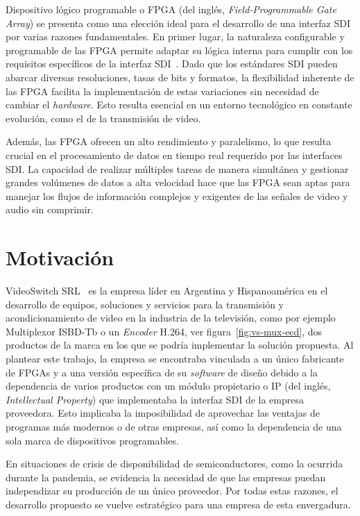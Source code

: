  Dispositivo lógico programable o FPGA (del inglés, \textit{Field-Programmable Gate Array}) se presenta como
  una elección ideal para el desarrollo de una interfaz SDI por varias razones
  fundamentales. En primer lugar, la naturaleza configurable y programable de las
  FPGA permite adaptar su lógica interna para cumplir con los requisitos
  específicos de la interfaz SDI~\citep{design}. Dado que los estándares SDI pueden abarcar
  diversas resoluciones, tasas de bits y formatos, la flexibilidad inherente de
  las FPGA facilita la implementación de estas variaciones sin necesidad de
  cambiar el \textit{hardware}. Esto resulta esencial en un entorno tecnológico
  en constante evolución, como el de la transmisión de video.

  Además, las FPGA ofrecen un alto rendimiento y paralelismo, lo que resulta
  crucial en el procesamiento de datos en tiempo real requerido por las interfaces
  SDI\@. La capacidad de realizar múltiples tareas de manera simultánea y gestionar
  grandes volúmenes de datos a alta velocidad hace que las FPGA sean aptas para
  manejar los flujos de información complejos y exigentes de las señales de video
  y audio sin comprimir.

\section{Motivación}

  VideoSwitch SRL~\citep{vs-srl} es la empresa líder en Argentina y Hispanoamérica
  en el desarrollo de equipos, soluciones y servicios para la transmisión y
  acondicionamiento de video en la industria de la televisión, como por ejemplo
  Multiplexor ISBD-Tb o un \textit{Encoder} H.264, ver figura~\ref{fig:vs-mux-ecd},
  dos productos de la marca en los que se podría implementar la solución propuesta.
  Al plantear este trabajo, la empresa se encontraba vinculada a un único
  fabricante de FPGAs y a una versión específica de su \textit{software} de
  diseño debido a la dependencia de varios productos con un módulo propietario o
  IP (del inglés, \textit{Intellectual Property}) que implementaba la interfaz SDI
  de la empresa proveedora. Esto implicaba la imposibilidad de aprovechar las
  ventajas de programas más modernos o de otras empresas, así como la dependencia
  de una sola marca de dispositivos programables.

  En situaciones de crisis de disponibilidad de semiconductores, como la ocurrida
  durante la pandemia, se evidencia la necesidad de que las empresas puedan
  independizar su producción de un único proveedor. Por todas estas razones, el
  desarrollo propuesto se vuelve estratégico para una empresa de esta envergadura.

